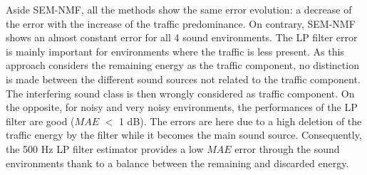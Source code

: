 \documentclass[review,5p,twocolumn,sort&compress,times]{elsarticle}
\begin{document}
Aside SEM-NMF, all the methods show the same error evolution: a decrease of the error with the increase of the traffic predominance. On contrary, SEM-NMF shows an almost constant error for all 4 sound environments. The LP filter error is mainly important for environments where the traffic is less present. As this approach considers the remaining energy as the traffic component, no distinction is made between the different sound sources not related to the traffic component. The interfering sound class is then wrongly considered as traffic component. On the opposite, for noisy and very noisy environments, the performances of the LP filter are good ($MAE$ $<$ 1 dB). The errors are here due to a high deletion of the traffic energy by the filter while it becomes the main sound source. Consequently, the 500 Hz LP filter estimator provides a low $MAE$ error through the sound environments thank to a balance between the remaining and discarded energy. 
\end{document}
